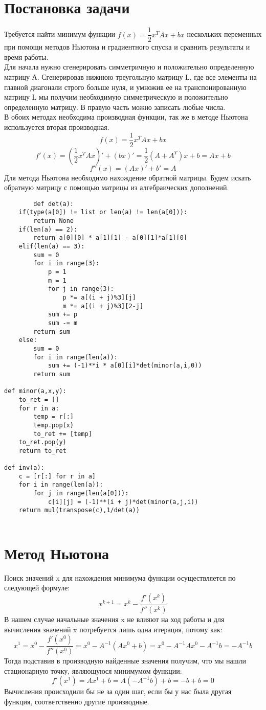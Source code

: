 \documentclass[14pt, titlepage,fleqn]{extarticle}
\begin{document}
	

	
	
	\newpage
	
 
	\clearpage
	\section*{Постановка задачи}
	Требуется найти минимум функции $f(x) = \dfrac{1}{2}x^TAx + bx$ нескольких переменных при помощи методов Ньютона и градиентного спуска и сравнить результаты и время работы.\\
	Для начала нужно сгенерировать симметричную и положительно определенную матрицу А. Сгенерировав нижнюю треугольную матрицу L, где все элементы на главной диагонали строго больше нуля, и умножив ее на транспонированную матрицу L мы получим необходимую симметрическую и положительно определенную матрицу. В правую часть можно записать любые числа.\\
	В обоих методах необходима производная функции, так же в методе Ньютона используется вторая производная.
	\[f(x)=\dfrac{1}{2} x^T Ax+bx\]
	\[f'(x) = \left( \dfrac{1}{2} x^T Ax  \right)' + (bx)' = \dfrac{1}{2}\left(A+ A^T \right)x+b=Ax+b\]
	\[f''(x)= (Ax)' + b' = A\]
	Для метода Ньютона необходимо нахождение обратной матрицы. Будем искать обратную матрицу с помощью матрицы из алгебраических дополнений.

	\begin{lstlisting}
		def det(a):
	if(type(a[0]) != list or len(a) != len(a[0])):
		return None
	if(len(a) == 2):
		return a[0][0] * a[1][1] - a[0][1]*a[1][0]
	elif(len(a) == 3):
		sum = 0
		for i in range(3):
			p = 1
			m = 1
			for j in range(3):
				p *= a[(i + j)%3][j]
				m *= a[(i + j)%3][2-j]
			sum += p
			sum -= m
		return sum
	else:
		sum = 0
		for i in range(len(a)):
			sum += (-1)**i * a[0][i]*det(minor(a,i,0))
		return sum

def minor(a,x,y):
	to_ret = []
	for r in a:
		temp = r[:]
		temp.pop(x)
		to_ret += [temp]
	to_ret.pop(y)
	return to_ret

def inv(a):
	c = [r[:] for r in a]
	for i in range(len(a)):
		for j in range(len(a[0])):
			c[i][j] = (-1)**(i + j)*det(minor(a,j,i))
	return mul(transpose(c),1/det(a))


	\end{lstlisting}
	\newpage


	\section*{Метод Ньютона}
	Поиск значений x для нахождения минимума функции осуществляется по следующей формуле:
	\[x^{k+1} = x^k - \dfrac{f'(x^k)}{f''(x^k)}\]
	В нашем случае начальные значения x не влияют на ход работы и для вычисления значений x потребуется лишь одна итерация, потому как:
	\[x^1 = x^0 - \dfrac{f'(x^0)}{f''(x^0)}= x^0 - A^{-1}(Ax^0 + b) = x^0 - A^{-1}Ax^0 - A^{-1}b = - A^{-1}b\]
	Тогда подставив в производную найденные значения получим, что мы нашли стационарную точку, являющуюся минимумом функции:
	\[f'(x^1) = Ax^{1} + b = A(-A^{-1}b) + b = -b +b =0\]
	Вычисления происходили бы не за один шаг, если бы у нас была другая функция, соответственно другие производные.
\end{document}
